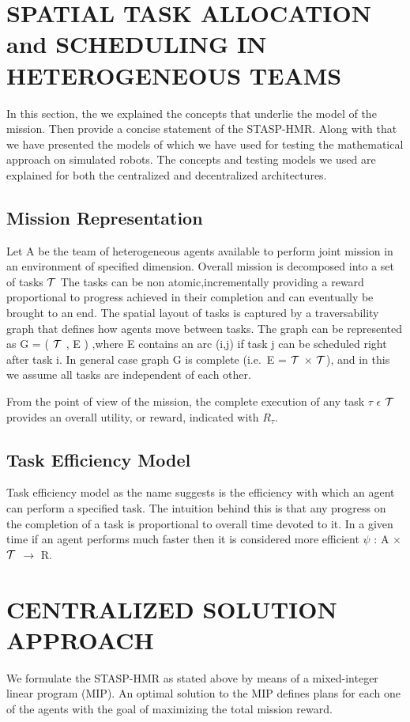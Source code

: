 \documentclass[conference]{IEEEtran}
\begin{document}
\section{SPATIAL TASK ALLOCATION and SCHEDULING IN HETEROGENEOUS TEAMS}
In this section, the we explained the concepts that underlie the model of the mission. Then provide a concise statement of the STASP-HMR. Along with that we have presented the models of which we have used for testing the mathematical approach on simulated robots. The concepts and testing models we used are explained for both the centralized and decentralized architectures. 
\subsection{Mission Representation}
Let A be the team of heterogeneous agents available to perform joint mission in an environment of specified dimension. Overall mission is decomposed into a set of tasks \( \mathcal{T} \) The tasks can be non atomic,incrementally providing a reward proportional to progress achieved in their completion and can eventually be brought to an end. The spatial layout of tasks is captured by a traversability graph that defines how agents move between tasks\cite{feo2016decentralized}.
The graph can be represented as G = ( \( \mathcal{T} \) , E ) ,where E contains an arc (i,j) if task j can be scheduled right after task i. In general case graph G is complete (i.e.\, E = \( \mathcal{T} \) \( \times \) \( \mathcal{T} \)), and in this we assume all tasks are independent of each other.

From the point of view of the mission, the complete execution of any task \( \tau \) \( \epsilon \) \( \mathcal{T} \) provides an overall utility, or reward, indicated with \( R_{\tau} \).

\subsection{Task Efficiency Model}
Task efficiency model as the name suggests is the efficiency with which an agent can perform a specified task. The intuition behind this is that any progress on the completion of a task is proportional to overall time devoted to it. In a given time if an agent performs much faster then it is considered more efficient \( \psi \) : A \( \times \) \( \mathcal{T} \) \( \to \) {R}\cite{feo2016decentralized}. 

\section{CENTRALIZED SOLUTION APPROACH}
We formulate the STASP-HMR as stated above by means of a mixed-integer linear program (MIP). An optimal solution to the MIP defines plans for each one of the agents with the goal of maximizing the total mission reward.
\end{document}
